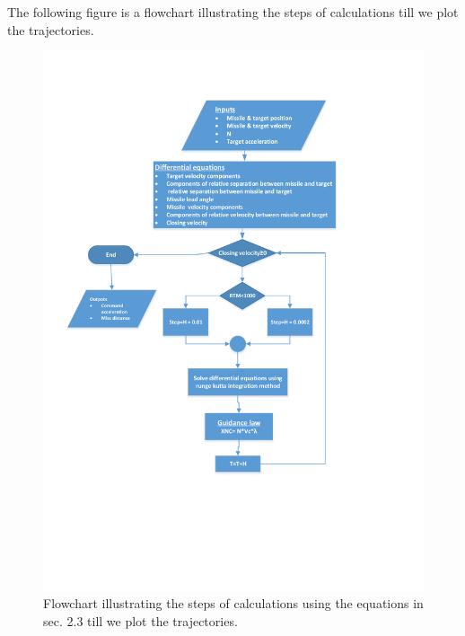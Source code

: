 The following figure is a flowchart illustrating the steps of calculations till we plot the trajectories.

\begin{figure}[H]
	\centering
	\includegraphics[scale = 0.8]{fig/FlowchartPN.pdf}
	\caption{Flowchart illustrating the steps of calculations using the equations in sec. 2.3  till we plot the trajectories.}
	\label{flowchart PN}
\end{figure}











